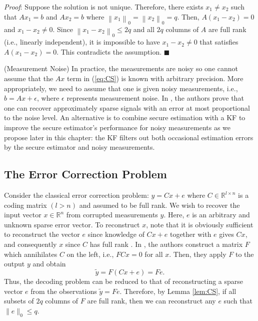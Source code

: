 \documentclass[../../thesis.tex]{subfiles}
\newcommand{\norm}[1]{\left\lVert#1\right\rVert}
\begin{document}
\textit{Proof}:
Suppose the solution is not unique. Therefore, there exists $x_1 \neq  x_2$ such that $Ax _1 = b$ and $Ax_2 = b$ where $\norm{x_1}_0 = \norm{x_2}_0 = q$. Then, $A(x_1 - x_2) = 0$ and $x_1 - x_2 \neq 0$. Since $\norm{x_1-x_2}_0 \leq 2q$ and all $2q$ columns of $A$ are full rank (i.e., linearly independent), it is impossible to have $x_1-x_2\neq 0$ that satisfies $A(x_1-x_2) = 0$. This contradicts the assumption.
\hfill$\blacksquare$


\begin{remark}
(Measurement Noise) In practice, the measurements are noisy so one cannot assume that the $Ax$ term in (\ref{eq:CS}) is known with arbitrary precision. More appropriately, we need to assume that one is given noisy measurements, i.e., $b = Ax + \epsilon$, where $\epsilon$ represents measurement noise. In \cite{Candes_Tao}, the authors prove that one can recover approximately sparse signals with an error at most proportional to the noise level. 
An alternative is to combine secure estimation with a KF to improve the secure estimator's performance for noisy measurements as we propose later in this chapter: the KF filters out both occasional estimation errors by the secure estimator and noisy measurements.
\end{remark}


\subsection{The Error Correction Problem \cite{tao11}}
Consider the classical error correction problem: $y=Cx + e$ where $C\in \mathbb{R}^{l\times n}$ is a coding matrix $(l > n)$ and assumed to be full rank. We wish to recover the input vector $x \in \mathbb{R}^n$ from corrupted measurements $y$. Here, $e$ is an arbitrary and unknown sparse error vector. To reconstruct $x$, note that it is obviously sufficient to reconstruct the vector $e$ since knowledge of $Cx + e$ together with $e$ gives $Cx$, and consequently $x$ since $C$ has full rank \cite{tao11}. In \cite{tao11}, the authors construct a matrix $F$ which annihilates $C$ on the left, i.e.,  $FCx = 0$ for all $x$. Then, they apply $F$ to the output $y$ and obtain
\begin{equation}
	\tilde y = F (Cx + e) = Fe.
\end{equation}
Thus, the decoding problem can be reduced to that of reconstructing a sparse vector $e$ from the observations $\tilde y = Fe$. Therefore, by Lemma \ref{lem:CS}, if all subsets of $2q$ columns of $F$ are full rank, then we can reconstruct any $e$ such that $\| e \|_0 \leq q$.
\end{document}
